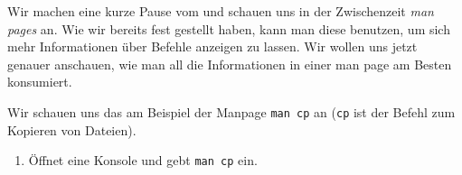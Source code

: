 
Wir machen eine kurze Pause vom \Cpp und schauen uns in der Zwischenzeit
\emph{man pages} an. Wie wir bereits fest gestellt haben, kann man diese
benutzen, um sich mehr Informationen über Befehle anzeigen zu lassen. Wir
wollen uns jetzt genauer anschauen, wie man all die Informationen in einer man
page am Besten konsumiert.

Wir schauen uns das am Beispiel der Manpage \texttt{man cp} an (\texttt{cp} ist
der Befehl zum Kopieren von Dateien).

\begin{praxis}
    \begin{enumerate}
        \item Öffnet eine Konsole und gebt \texttt{man cp} ein.
    \end{enumerate}
\end{praxis}

